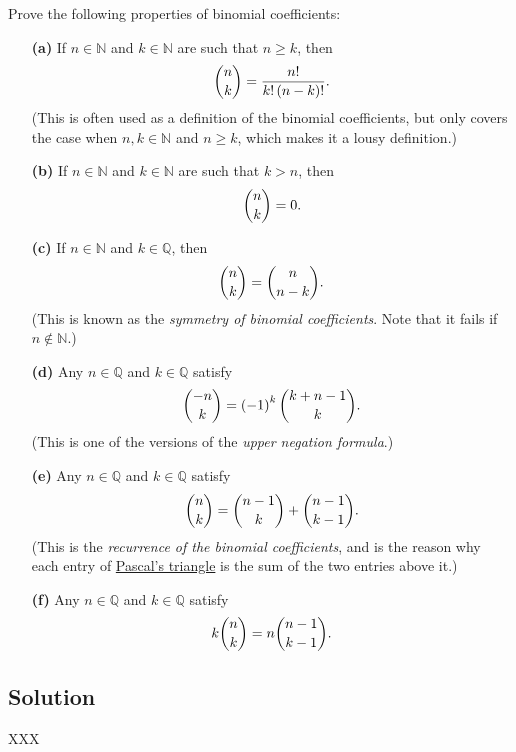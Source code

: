 \documentclass[paper=a4, fontsize=12pt]{scrartcl} %
\newcommand{\QQ}{\mathbb{Q}} %
\newcommand{\NN}{\mathbb{N}} %
\newcommand{\tup}[1]{\left( #1 \right)}
\theoremstyle{plainsl}
\theoremstyle{definition}
\theoremstyle{remark}
\begin{document}
Prove the following properties of binomial coefficients:

\begin{enumerate}

\item[\textbf{(a)}]
If $n \in \NN$ and $k \in \NN$ are such that $n \geq k$,
then
\[
\dbinom{n}{k}
= \dfrac{n!}{k! \tup{n-k}!} .
\]
(This is often used as a definition of the binomial coefficients,
but only covers the case when $n, k \in \NN$ and $n \geq k$,
which makes it a lousy definition.)

\item[\textbf{(b)}]
If $n \in \NN$ and $k \in \NN$ are such that $k > n$, then
\[
\dbinom{n}{k} = 0.
\]

\item[\textbf{(c)}]
If $n \in \NN$ and $k \in \QQ$, then
\[
\dbinom{n}{k} = \dbinom{n}{n-k} .
\]
(This is known as the \textit{symmetry of binomial coefficients}.
Note that it fails if $n \notin \NN$.)

\item[\textbf{(d)}]
Any $n \in \QQ$ and $k \in \QQ$ satisfy
\[
\dbinom{-n}{k} = \tup{-1}^k \dbinom{k + n - 1}{k} .
\]
(This is one of the versions of the \textit{upper negation formula}.)

\item[\textbf{(e)}]
Any $n \in \QQ$ and $k \in \QQ$ satisfy
\[
\dbinom{n}{k} = \dbinom{n-1}{k} + \dbinom{n-1}{k-1} .
\]
(This is the \textit{recurrence of the binomial coefficients},
and is the reason why each entry of
\href{https://en.wikipedia.org/wiki/Pascal%27s_triangle}{Pascal's triangle}
is the sum of the two entries above it.)

\item[\textbf{(f)}]
Any $n \in \QQ$ and $k \in \QQ$ satisfy
\[
k \dbinom{n}{k} = n \dbinom{n-1}{k-1} .
\]

\end{enumerate}

\subsection{Solution}

XXX
\end{document}
